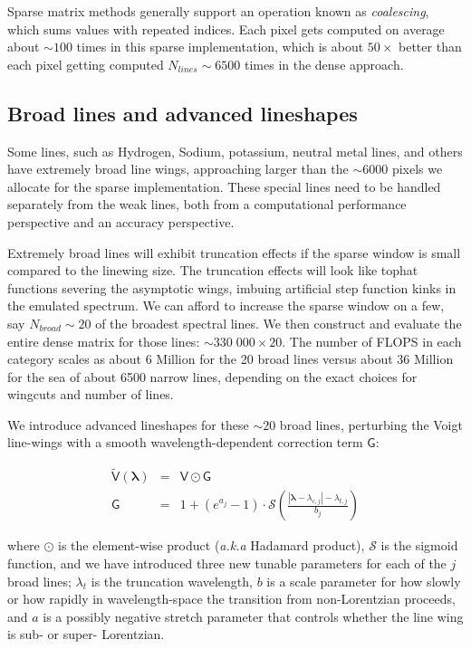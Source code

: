 \documentclass[modern]{aastex631}
\begin{document}
Sparse matrix methods generally support an operation known as \emph{coalescing}, which sums values with repeated indices.    Each pixel gets computed on average about $\sim100$ times in this sparse implementation, which is about $50\times$ better than each pixel getting computed $N_{lines}\sim6500$ times in the dense approach.


\subsection{Broad lines and advanced lineshapes}

Some lines, such as Hydrogen, Sodium, potassium, neutral metal lines, and others have extremely broad line wings, approaching larger than the $\sim6000$ pixels we allocate for the sparse implementation. These special lines need to be handled separately from the weak lines, both from a computational performance perspective and an accuracy perspective.

Extremely broad lines will exhibit truncation effects if the sparse window is small compared to the linewing size. The truncation effects will look like tophat functions severing the asymptotic wings, imbuing artificial step function kinks in the emulated spectrum.  We can afford to increase the sparse window on a few, say $N_{broad}\sim20$ of the broadest spectral lines. We then construct and evaluate the entire dense matrix for those lines: $\sim 330\;000 \times 20$. The number of FLOPS in each category scales as about 6 Million for the 20 broad lines versus about 36 Million for the sea of about 6500 narrow lines, depending on the exact choices for wingcuts and number of lines.

We introduce advanced lineshapes for these $\sim20$ broad lines, perturbing the Voigt line-wings with a smooth wavelength-dependent correction term $\mathsf{G}$:

\begin{eqnarray}
  \mathsf{\tilde{V}(\bm{\lambda})} &=& \mathsf{V} \odot \mathsf{G}\\
  \mathsf{G} &=& 1 + (e^{a_j} - 1) \cdot \mathcal{S}\left(\frac{|\bm{\lambda}-\lambda_{c,j}| - \lambda_{t, j}}{b_j}\right)
\end{eqnarray}

where $\odot$ is the element-wise product (\emph{a.k.a} Hadamard product), $\mathcal{S}$ is the sigmoid function, and we have introduced three new tunable parameters for each of the $j$ broad lines; $\lambda_t$ is the truncation wavelength, $b$ is a scale parameter for how slowly or how rapidly in wavelength-space the transition from non-Lorentzian proceeds, and $a$ is a possibly negative stretch parameter that controls whether the line wing is sub- or super- Lorentzian.
\end{document}
